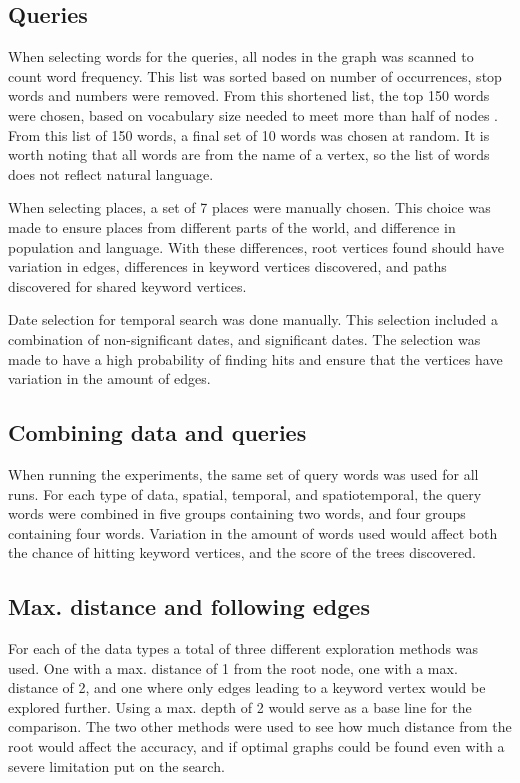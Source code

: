 \subsection{Queries}
When selecting words for the queries, all nodes in the graph was scanned to count word frequency. This list was sorted based on number of occurrences, stop words and numbers were removed. From this shortened list, the top 150 words were chosen, based on vocabulary size needed to meet more than half of nodes \cite{zipf,worthington1996using}. From this list of 150 words, a final set of 10 words was chosen at random. It is worth noting that all words are from the name of a vertex, so the list of words does not reflect natural language.

When selecting places, a set of 7 places were manually chosen. This choice was made to ensure places from different parts of the world, and difference in population and language. With these differences, root vertices found should have variation in edges, differences in keyword vertices discovered, and paths discovered for shared keyword vertices.

Date selection for temporal search was done manually. This selection included a combination of non-significant dates, and significant dates. The selection was made to have a high probability of finding hits and ensure that the vertices have variation in the amount of edges.

\subsection{Combining data and queries}
When running the experiments, the same set of query words was used for all runs. For each type of data, spatial, temporal, and spatiotemporal, the query words were combined in five groups containing two words, and four groups containing four words. Variation in the amount of words used would affect both the chance of hitting keyword vertices, and the score of the trees discovered.

\subsection{Max. distance and following edges}
For each of the data types a total of three different exploration methods was used. One with a max. distance of 1 from the root node, one with a max. distance of 2, and one where only edges leading to a keyword vertex would be explored further. Using a max. depth of 2 would serve as a base line for the comparison. The two other methods were used to see how much distance from the root would affect the accuracy, and if optimal graphs could be found even with a severe limitation put on the search.

